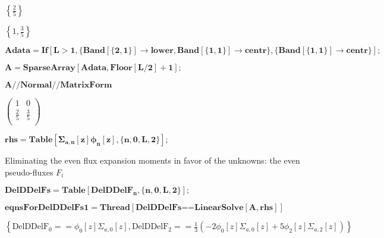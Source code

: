 \documentclass{article}
\begin{document}
\begin{doublespace}
\noindent\(\left\{\frac{2}{5}\right\}\)
\end{doublespace}

\begin{doublespace}
\noindent\(\left\{1,\frac{3}{5}\right\}\)
\end{doublespace}

\begin{doublespace}
\noindent\(\pmb{\text{Adata}=\text{If}[L>1,\{\text{Band}[\{2,1\}]\to \text{lower},\text{Band}[\{1,1\}]\to \text{centr}\},\{\text{Band}[\{1,1\}]\to
\text{centr}\}];}\)
\end{doublespace}

\begin{doublespace}
\noindent\(\pmb{A=\text{SparseArray}[\text{Adata},\text{Floor}[L/2]+1];}\)
\end{doublespace}

\begin{doublespace}
\noindent\(\pmb{A\text{//}\text{Normal}\text{//}\text{MatrixForm}}\)
\end{doublespace}

\begin{doublespace}
\noindent\(\left(
\begin{array}{cc}
 1 & 0 \\
 \frac{2}{5} & \frac{3}{5} \\
\end{array}
\right)\)
\end{doublespace}

\begin{doublespace}
\noindent\(\pmb{\text{rhs}=\text{Table}\left[\Sigma _{a,n}[z]\phi _n[z],\{n,0,L,2\}\right];}\)
\end{doublespace}

Eliminating the even flux { }expansion moments in favor of the unknowns: the even pseudo-fluxes \(F_i\)

\begin{doublespace}
\noindent\(\pmb{\text{DelDDelFs}=\text{Table}\left[\text{DelDDelF}_n,\{n,0,L,2\}\right];}\)
\end{doublespace}

\begin{doublespace}
\noindent\(\pmb{\text{eqnsForDelDDelFs1}=\text{Thread}[\text{DelDDelFs}\text{==}\text{LinearSolve}[A,\text{rhs}]]}\)
\end{doublespace}

\begin{doublespace}
\noindent\(\left\{\text{DelDDelF}_0==\phi _0[z] \Sigma _{a,0}[z],\text{DelDDelF}_2==\frac{1}{3} \left(-2 \phi _0[z] \Sigma _{a,0}[z]+5 \phi _2[z]
\Sigma _{a,2}[z]\right)\right\}\)
\end{doublespace}
\end{document}
